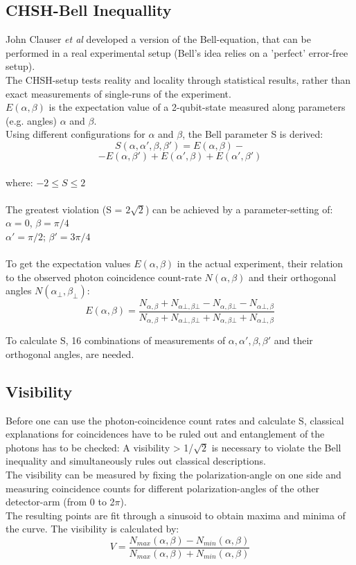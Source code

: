 \documentclass[12pt,a4paper]{article}
\begin{document}
\begin{multicols}{2}
\subsection{CHSH-Bell Inequallity}
John Clauser \textit{et al} developed a version of the Bell-equation, that can be performed in a real experimental setup (Bell's idea relies on a 'perfect' error-free setup).\\
The CHSH-setup tests reality and locality through statistical results, rather than exact measurements of single-runs of the experiment.\\
$E(\alpha, \beta)$ is the expectation value of a 2-qubit-state measured along parameters (e.g. angles) $\alpha$ and $\beta$.\\
Using different configurations for $\alpha$ and $\beta$, the Bell parameter S is derived:
$$S(\alpha, \alpha', \beta, \beta') = E(\alpha, \beta) - $$
$$-E(\alpha, \beta') + E(\alpha', \beta) + E(\alpha', \beta')$$
\\
where:  $-2 \le S \le 2$\\
\\
The greatest violation (S = $2 \sqrt{2}$) can be achieved by a parameter-setting of:\\
$\alpha = 0$,  $\beta = \pi / 4$\\
$\alpha' = \pi/2$; $\beta' = 3\pi/4$\\
\\
To get the expectation values $E(\alpha, \beta)$ in the actual experiment, their relation to the observed photon coincidence count-rate $N(\alpha, \beta)$ and their orthogonal angles $N(\alpha_{\bot}, \beta_{ \bot})$:
$$E(\alpha, \beta) = \frac{N_{\alpha, \beta} + N_{\alpha\bot, \beta\bot}-N_{\alpha, \beta\bot}-N_{\alpha\bot, \beta}}{N_{\alpha, \beta} + N_{\alpha\bot, \beta\bot}+N_{\alpha, \beta\bot}+N_{\alpha\bot, \beta}}$$

\noindent To calculate S, 16 combinations of measurements of $\alpha, \alpha', \beta, \beta'$ and their orthogonal angles, are needed.

\subsection{Visibility}
Before one can use the photon-coincidence count rates and calculate S, classical explanations for coincidences have to be ruled out and entanglement of the photons has to be checked: A visibility > 1/$\sqrt{2}$ is necessary to violate the Bell inequality and simultaneously rules out classical descriptions.\\
The visibility can be measured by fixing the polarization-angle on one side and measuring coincidence counts for different polarization-angles of the other detector-arm (from 0 to 2$\pi$).\\
The resulting points are fit through a sinusoid to obtain maxima and minima of the curve. The visibility is calculated by:
$$V = \frac{N_{max}(\alpha, \beta) - N_{min}(\alpha, \beta)}{N_{max}(\alpha, \beta) + N_{min}(\alpha, \beta)}$$


\end{multicols}
\end{document}
